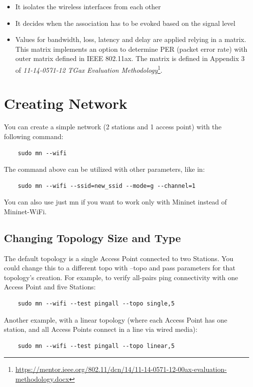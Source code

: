 \begin{itemize}
  \item It isolates the wireless interfaces from each other
  \item It decides when the association has to be evoked based on the signal level
  \item Values for bandwidth, loss, latency and delay are applied relying in a matrix. This matrix implements an option to determine PER (packet error rate) with outer matrix
defined in IEEE 802.11ax. The matrix is defined in Appendix 3 of
\textit{11-14-0571-12 TGax Evaluation Methodology}\footnote{\url{https://mentor.ieee.org/802.11/dcn/14/11-14-0571-12-00ax-evaluation-methodology.docx}}.
\end{itemize}

\section{Creating Network}

You can create a simple network (2 stations and 1 access point) with the following command:
\begin{verbatim}
    sudo mn --wifi
\end{verbatim}

\noindent The command above can be utilized with other parameters, like in:
\begin{verbatim}
    sudo mn --wifi --ssid=new_ssid --mode=g --channel=1
\end{verbatim}

\noindent You can also use just mn if you want to work only with Mininet instead of Mininet-WiFi.

\subsection{Changing Topology Size and Type}
The default topology is a single Access Point connected to two Stations. You could change this to a different topo with --topo and pass parameters for that topology’s creation. For example, to verify all-pairs ping connectivity with one Access Point and five Stations:
\begin{verbatim}
    sudo mn --wifi --test pingall --topo single,5
\end{verbatim}

\noindent Another example, with a linear topology (where each Access Point has one station, and all Access Points connect in a line via wired media):
\begin{verbatim}
    sudo mn --wifi --test pingall --topo linear,5
\end{verbatim}

